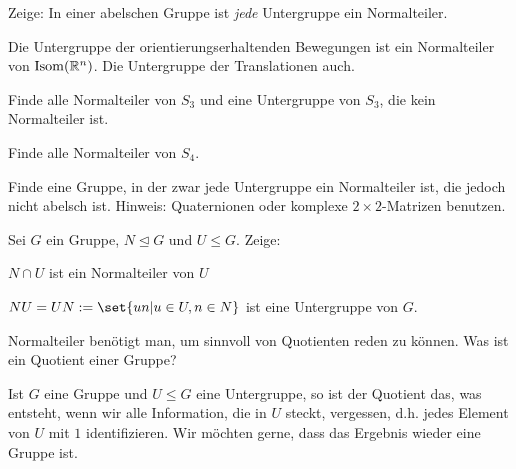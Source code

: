 \begin{sheet}
\begin{problem}
\begin{subproblem}[difficulty={sehr leicht}]
Zeige: In einer abelschen Gruppe ist \emph{jede} Untergruppe ein Normalteiler.
\end{subproblem}
\begin{subproblem}
Die Untergruppe der orientierungserhaltenden Bewegungen ist ein Normalteiler von $\operatorname{Isom}(\mathbb{R}^n)$. Die Untergruppe der Translationen auch.
\end{subproblem}
\begin{subproblem}[difficulty={leicht}]
Finde alle Normalteiler von $S_3$ und eine Untergruppe von $S_3$, die kein Normalteiler ist.
\end{subproblem}
\begin{subproblem}[difficulty={mittel}]
Finde alle Normalteiler von $S_4$.
\end{subproblem}
\begin{subproblem}[difficulty={schwer}]
Finde eine Gruppe, in der zwar jede Untergruppe ein Normalteiler ist, die jedoch nicht abelsch ist. Hinweis: Quaternionen oder komplexe $2\times 2$-Matrizen benutzen.
\end{subproblem}
\end{problem}

\begin{problem}[title={Normalteiler und Untergruppen}]
Sei $G$ ein Gruppe, $N\unlhd G$ und $U\leq G$. Zeige:

\begin{subproblem}[difficulty={leicht}]
$N\cap U$ ist ein Normalteiler von $U$
\end{subproblem}
\begin{subproblem}[difficulty={leicht bis mittel}]
$NU = UN := \set{un | u\in U, n\in N}$ ist eine Untergruppe von $G$.
\end{subproblem}
\end{problem}

\begin{problem}[title={Quotientengruppen}, difficulty={fortgeschritten}]
Normalteiler benötigt man, um sinnvoll von Quotienten reden zu können. Was ist ein Quotient einer Gruppe?

Ist $G$ eine Gruppe und $U\leq G$ eine Untergruppe, so ist der Quotient das, was entsteht, wenn wir alle Information, die in $U$ steckt, vergessen, d.h. jedes Element von $U$ mit $1$ identifizieren. Wir möchten gerne, dass das Ergebnis wieder eine Gruppe ist.


\end{problem}
\end{sheet}
